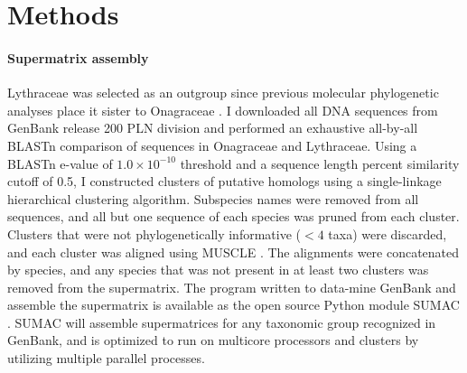 \documentclass[review]{elsarticle}
\begin{document}
\section{Methods}

\paragraph{Supermatrix assembly} 

Lythraceae was selected as an outgroup since previous molecular phylogenetic analyses
place it sister to Onagraceae \citep{conti1997, Sytsma2004}.
I downloaded all DNA sequences from GenBank release 200 PLN division and
performed an exhaustive all-by-all BLASTn \citep{blast} comparison of sequences in Onagraceae
and Lythraceae.
Using a BLASTn e-value of $1.0 \times 10^{-10}$ threshold and a sequence length
percent similarity cutoff of 0.5,
I constructed clusters of putative homologs using a single-linkage hierarchical clustering algorithm.
Subspecies names were removed from all sequences, and all but one sequence of each species was pruned from each cluster.
Clusters that were not phylogenetically informative ($< 4$ taxa) were discarded,
and each cluster was aligned using MUSCLE \citep{edgar2004muscle}. 
The alignments were concatenated by species, and any species that was not present in at least
two clusters was removed from the supermatrix.
The program written to data-mine GenBank and assemble the supermatrix 
is available as the open source Python module 
SUMAC \citep{sumac}.
SUMAC will assemble
supermatrices for any taxonomic group recognized in GenBank, 
and is optimized to run on multicore processors and clusters by utilizing multiple parallel processes.
\end{document}
